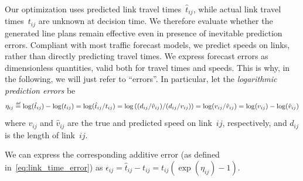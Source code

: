 \documentclass[a4paper,fleqn]{cas-sc}
\newcommand{\defeq}{\stackrel{\scalebox{0.5}{\ensuremath{\mathsf{\,def}}}}{=}}
\begin{document}
Our optimization uses predicted link travel times~$\hat t_{ij}$, while actual link travel times~$t_{ij}$ are unknown at decision time. We therefore evaluate whether the generated line plans remain effective even in presence of inevitable prediction errors.
Compliant with most traffic forecast models, we predict speeds on links, rather than directly predicting travel times. We express forecast errors as dimensionless quantities, valid both for travel times and speeds. This is why, in the following, we will just refer to ``errors''. In particular, let the \emph{logarithmic prediction errors} be 
\begin{equation}
\eta_{ij}\defeq 
\log(\hat t_{ij})-\log(t_{ij})=
\log(\hat t_{ij}/t_{ij})
=
\log\left( (d_{ij}/\hat v_{ij})/(d_{ij}/v_{ij}) \right)
=
\log( v_{ij}/ \hat v_{ij})
=
\log(v_{ij})-\log(\hat v_{ij})
\end{equation}
where $v_{ij}$ and $\hat v_{ij}$ are the true and predicted speed on link~$ij$, respectively, and $d_{ij}$ is the length of link~$ij$.

We can express the corresponding additive error (as defined in~\eqref{eq:link_time_error}) as $\epsilon_{ij}=\hat t_{ij}-t_{ij}=t_{ij}(\exp(\eta_{ij})-1)$.
%
\end{document}
